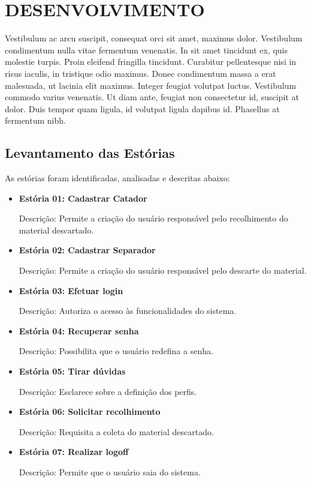 \chapter{DESENVOLVIMENTO}
\label{cap:desenvolvimento}
Vestibulum ac arcu suscipit, consequat orci sit amet, maximus dolor. Vestibulum condimentum nulla vitae fermentum venenatis. In sit amet tincidunt ex, quis molestie turpis. Proin eleifend fringilla tincidunt. Curabitur pellentesque nisi in risus iaculis, in tristique odio maximus. Donec condimentum massa a erat malesuada, ut lacinia elit maximus. Integer feugiat volutpat luctus. Vestibulum commodo varius venenatis. Ut diam ante, feugiat non consectetur id, suscipit at dolor. Duis tempor quam ligula, id volutpat ligula dapibus id. Phasellus at fermentum nibh.

\section{Levantamento das Estórias}

As estórias foram identificadas, analisadas e descritas abaixo:

\begin{itemize}
	\item \textbf{Estória 01: Cadastrar Catador}\par
Descrição: Permite a criação do usuário responsável pelo recolhimento do material descartado.

	\item \textbf{Estória 02: Cadastrar Separador}\par
Descrição: Permite a criação do usuário responsável pelo descarte do material.

	\item \textbf{Estória 03: Efetuar login}\par
Descrição: Autoriza o acesso às funcionalidades do sistema. 

	\item \textbf{Estória 04: Recuperar senha }\par
Descrição: Possibilita que o usuário redefina a senha.

	\item \textbf{Estória 05: Tirar dúvidas }\par
Descrição: Esclarece sobre a definição dos perfis. 

	\item \textbf{Estória 06: Solicitar recolhimento}\par
Descrição: Requisita a coleta do material descartado.

	\item \textbf{Estória 07: Realizar logoff}\par
Descrição: Permite que o usuário saia do sistema.

\end{itemize}


